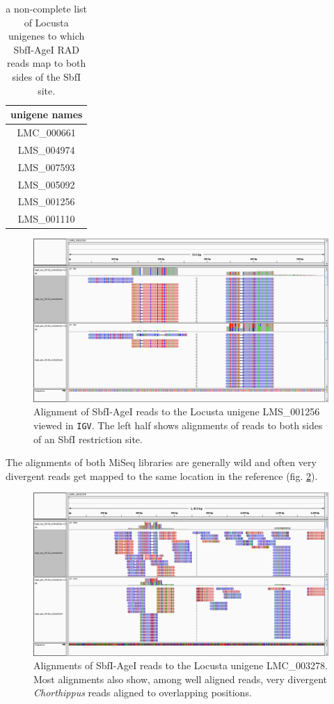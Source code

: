 \documentclass{article}\usepackage[]{graphicx}\usepackage[]{color}
\begin{document}
\begin{table}[b]
\centering
\caption{a non-complete list of Locusta unigenes to which SbfI-AgeI RAD reads map to both sides of the SbfI site.}
\begin{tabular}{c}
\toprule
unigene names\\
\midrule
LMC\_000661\\
LMS\_004974\\
LMS\_007593\\
LMS\_005092\\
LMS\_001256\\
LMS\_001110\\
\bottomrule
\end{tabular}
\label{both_sides_tab}
\end{table}

\begin{figure}
\centering
\includegraphics[width=\textwidth]{./figure/igv_LMS_001256}
\caption{Alignment of SbfI-AgeI reads to the Locusta unigene LMS\_001256 viewed in \texttt{IGV}. The left half shows alignments of reads to both sides of an SbfI restriction site.}
\label{both_sides_fig}
\end{figure}

The alignments of both MiSeq libraries are generally wild and often very divergent reads get mapped to the same location in the reference (fig. \ref{igv_LMC_003278}). 

\begin{figure}
\centering
\includegraphics[width=\textwidth]{./figure/igv_LMC_003278}
\caption{Alignments of SbfI-AgeI reads to the Locusta unigene LMC\_003278. Most alignments also show, among well aligned reads, very divergent \textit{Chorthippus} reads aligned to overlapping positions.}
\label{igv_LMC_003278}
\end{figure}
\end{document}
